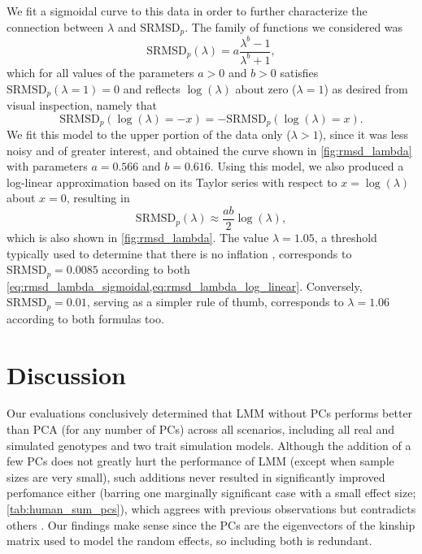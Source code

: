 \documentclass[11pt]{article}
\newcommand{\rmsd}{\text{SRMSD}_p}
\begin{document}
We fit a sigmoidal curve to this data in order to further characterize the connection between $\lambda$ and $\rmsd$.
The family of functions we considered was
\begin{equation}
  \label{eq:rmsd_lambda_sigmoidal}
  \rmsd( \lambda ) = a \frac{ \lambda^b - 1 }{ \lambda^b + 1 },
\end{equation}
which for all values of the parameters $a > 0$ and $b > 0$ satisfies $\rmsd( \lambda = 1 ) = 0$ and reflects $\log( \lambda )$ about zero ($\lambda = 1$) as desired from visual inspection, namely that
$$
\rmsd( \log( \lambda ) = -x ) = - \rmsd( \log( \lambda ) = x ).
$$
We fit this model to the upper portion of the data only ($\lambda > 1$), since it was less noisy and of greater interest, and obtained the curve shown in \cref{fig:rmsd_lambda} with parameters $a = 0.566$ and $b = 0.616$.
Using this model, we also produced a log-linear approximation based on its Taylor series with respect to $x = \log( \lambda )$ about $x=0$, resulting in
\begin{equation}
  \label{eq:rmsd_lambda_log_linear}
  \rmsd( \lambda ) \approx \frac{a b}{2} \log( \lambda ),
\end{equation}
which is also shown in \cref{fig:rmsd_lambda}.
The value $\lambda = 1.05$, a threshold typically used to determine that there is no inflation \citep{price_new_2010}, corresponds to $\rmsd = 0.0085$ according to both \cref{eq:rmsd_lambda_sigmoidal,eq:rmsd_lambda_log_linear}.
Conversely, $\rmsd = 0.01$, serving as a simpler rule of thumb, corresponds to $\lambda = 1.06$ according to both formulas too.


\section{Discussion}

Our evaluations conclusively determined that LMM without PCs performs better than PCA (for any number of PCs) across all scenarios, including all real and simulated genotypes and two trait simulation models.
Although the addition of a few PCs does not greatly hurt the performance of LMM (except when sample sizes are very small), such additions never resulted in significantly improved perfomance either (barring one marginally significant case with a small effect size; \cref{tab:human_sum_pcs}), which aggrees with previous observations \citep{liu_controlling_2011} but contradicts others \citep{zhao_arabidopsis_2007, price_new_2010}.
Our findings make sense since the PCs are the eigenvectors of the kinship matrix used to model the random effects, so including both is redundant.
\end{document}
